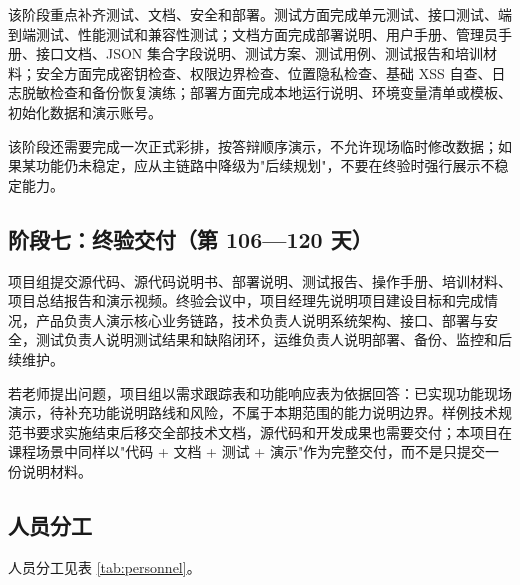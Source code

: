 该阶段重点补齐测试、文档、安全和部署。测试方面完成单元测试、接口测试、端到端测试、性能测试和兼容性测试；文档方面完成部署说明、用户手册、管理员手册、接口文档、JSON 集合字段说明、测试方案、测试用例、测试报告和培训材料；安全方面完成密钥检查、权限边界检查、位置隐私检查、基础 XSS 自查、日志脱敏检查和备份恢复演练；部署方面完成本地运行说明、环境变量清单或模板、初始化数据和演示账号。

该阶段还需要完成一次正式彩排，按答辩顺序演示，不允许现场临时修改数据；如果某功能仍未稳定，应从主链路中降级为"后续规划"，不要在终验时强行展示不稳定能力。

\subsection{阶段七：终验交付（第 106—120 天）}

项目组提交源代码、源代码说明书、部署说明、测试报告、操作手册、培训材料、项目总结报告和演示视频。终验会议中，项目经理先说明项目建设目标和完成情况，产品负责人演示核心业务链路，技术负责人说明系统架构、接口、部署与安全，测试负责人说明测试结果和缺陷闭环，运维负责人说明部署、备份、监控和后续维护。

若老师提出问题，项目组以需求跟踪表和功能响应表为依据回答：已实现功能现场演示，待补充功能说明路线和风险，不属于本期范围的能力说明边界。样例技术规范书要求实施结束后移交全部技术文档，源代码和开发成果也需要交付；本项目在课程场景中同样以"代码 + 文档 + 测试 + 演示"作为完整交付，而不是只提交一份说明材料。

\subsection{人员分工}

人员分工见表 \ref{tab:personnel}。


